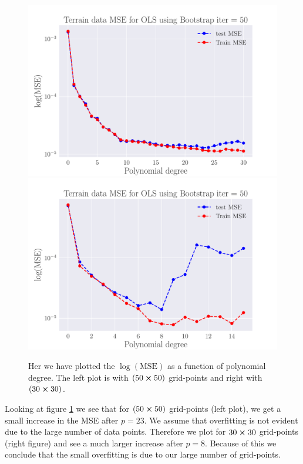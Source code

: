 \documentclass[reprint,english,notitlepage,aps,nobalancelastpage,nofootinbib]{revtex4-1}  %
\begin{document}
\begin{figure}[h]
  \includegraphics[width=\linewidth]{SRTM_MSE_OLS_n50_pol30_Bootstrap_re50_log.pdf}
  \endminipage\hfill
  \includegraphics[width=\linewidth]{SRTM_MSE_OLS_n30_pol15_Bootstrap_re50_log.pdf}
  \endminipage
  \caption{Her we have plotted the $\log(\text{MSE})$ as a function of polynomial degree. The left plot is with $(50\cross50)$ grid-points and right with $(30\cross30)$.}
  \label{fig:terrain_OLS_MSE_bootstrap}
\end{figure}

Looking at figure \ref{fig:terrain_OLS_MSE_bootstrap} we see that for $(50\cross50)$ grid-points (left plot), we get a small increase in the MSE after $p = 23$. We assume that overfitting is not evident due to the large number of data points. Therefore we plot for $30\cross30$ grid-points (right figure) and see a much larger increase after $p = 8$. Because of this we conclude that the small overfitting is due to our large number of grid-points.
\end{document}
